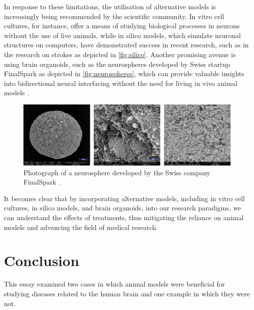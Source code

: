 \documentclass[10pt]{article}
\begin{document}
\begin{sloppypar}
  In response to these limitations, the utilisation of alternative models is increasingly being recommended by the scientific community. In vitro cell cultures, for instance, offer a means of studying biological processes in neurons without the use of live animals, while in silico models, which simulate neuronal structures on computers, have demonstrated success in recent research, such as in the research on strokes \citep{bing_medical_2020} as depicted in \autoref{fig:silico}. Another promising avenue is using brain organoids, such as the neurospheres developed by Swiss startup FinalSpark as depicted in \autoref{fig:neurospheres}, which can provide valuable insights into bidirectional neural interfacing without the need for living in vivo animal models \citep{finalspark_artificial_2022}.

  \vspace{10pt} %
  \begin{figure}[ht]
    \centering
    \includegraphics[width=\textwidth]{figures/neurosphere.png}
    \caption[Photographs of a neurosphere developed by the Swiss company FinalSpark]{Photograph of a neurosphere developed by the Swiss company FinalSpark \citep{finalspark_artificial_2022}.}
    \label{fig:neurospheres}
  \end{figure}

  It becomes clear that by incorporating alternative models, including in vitro cell cultures, in silico models, and brain organoids, into our research paradigms, we can understand the effects of treatments, thus mitigating the reliance on animal models and advancing the field of medical research.

  \section{Conclusion}
  \label{sec:conclusion}

  This essay examined two cases in which animal models were beneficial for studying diseases related to the human brain and one example in which they were not.


\end{sloppypar}
\end{document}
